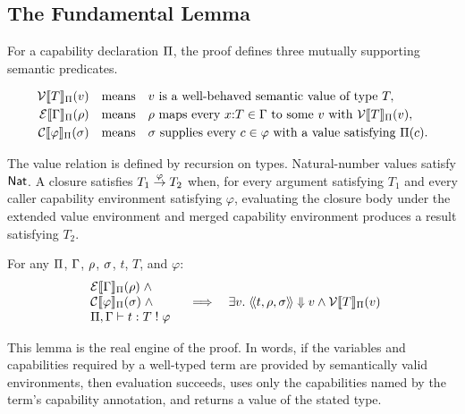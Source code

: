 \subsection{The Fundamental Lemma}

\begin{definition}
\label{def:logical-relations}
For a capability declaration $\cpdecl$, the proof defines three mutually
supporting semantic predicates. %

\[
\begin{array}{rcl}
\haltsval{\cpdecl}{v}{T}
&\text{means}&
v \text{ is a well-behaved semantic value of type } T, \\[0.25em]
\haltsenv{\cpdecl}{\tpenv}{\vlenv}
&\text{means}&
\vlenv \text{ maps every } x{:}T \in \tpenv
\text{ to some } v \text{ with } \haltsval{\cpdecl}{v}{T}, \\[0.25em]
\haltscpenv{\cpdecl}{\varphi}{\cpenv}
&\text{means}&
\cpenv \text{ supplies every } c \in \varphi
\text{ with a value satisfying } \cpdecl(c).
\end{array}
\]

The value relation is defined by recursion on types. %
Natural-number values satisfy $\tnat$. %
A closure satisfies $\tarr{T_1}{T_2}{\varphi}{\varphi}$ when, for every argument
satisfying $T_1$ and every caller capability environment satisfying $\varphi$,
evaluating the closure body under the extended value environment and merged
capability environment produces a result satisfying $T_2$. %
\end{definition}

\begin{lemma}
\label{lem:halts-env-closed}
For any $\cpdecl$, $\tpenv$, $\vlenv$, $\cpenv$, $t$, $T$, and $\varphi$:
\[
\begin{array}{l}
\haltsenv{\cpdecl}{\tpenv}{\vlenv} \;\land \\
\haltscpenv{\cpdecl}{\varphi}{\cpenv} \;\land \\
\typ{\cpdecl}{\tpenv}{t}{T}{\varphi}
\end{array}
\quad\Longrightarrow\quad
\exists v.\; \eval{t}{\vlenv}{\cpenv}{v} \land \haltsval{\cpdecl}{v}{T}
\]
\end{lemma}

This lemma is the real engine of the proof. %
In words, if the variables and capabilities required by a well-typed term are
provided by semantically valid environments, then evaluation succeeds, uses only
the capabilities named by the term's capability annotation, and returns a value
of the stated type. %

